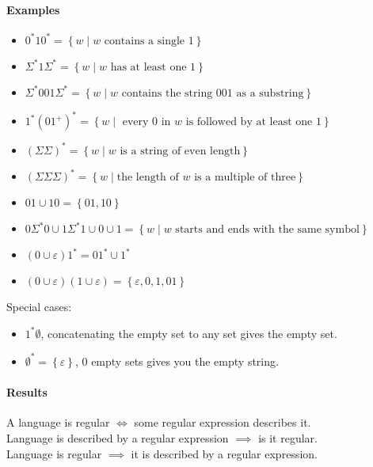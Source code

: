 \documentclass[12 pt]{article}
\begin{document}
\paragraph{Examples}
\begin{itemize}
\item $0^*10^* = \left\{w \mid w \text{ contains a single } 1\right\}$
\item $\Sigma^* 1 \Sigma^* = \left\{w \mid w \text{ has at least one }
  1\right\}$
\item $\Sigma^* 001 \Sigma^* = \left\{w \mid w \text{ contains the
      string } 001 \text{ as a substring}\right\}$
\item $1^*(01^+)^* = \left\{w \mid \text{ every } 0 \text{ in } w
    \text{ is followed by at least one } 1\right\}$
\item $(\Sigma \Sigma)^* = \left\{w \mid w \text{ is a string of even
      length}\right\}$
\item $(\Sigma \Sigma \Sigma)^* = \left\{w \mid \text{the length of }
    w \text{ is a multiple of three}\right\}$
\item $01 \cup 10 = \left\{01, 10\right\}$
\item $0\Sigma^*0 \cup 1 \Sigma^* 1 \cup 0 \cup 1 = \left\{w \mid w
    \text{ starts and ends with the same symbol}\right\}$
\item $(0 \cup \varepsilon)1^* = 01^* \cup 1^*$
\item $(0 \cup \varepsilon)(1 \cup \varepsilon) = \left\{\varepsilon,
    0, 1, 01\right\}$
\end{itemize}
Special cases:
\begin{itemize}
\item $1^* \emptyset$, concatenating the empty set to any set gives
  the empty set.
\item $\emptyset^* = \left\{\varepsilon\right\}$, $0$ empty sets gives
  you the empty string.
\end{itemize}
\paragraph{Results}
A language is regular $\iff$ some regular expression describes it.
\\ Language is described by a regular expression $\implies$ is it
regular.
\\ Language is regular $\implies$ it is described by a regular
expression.
\end{document}
